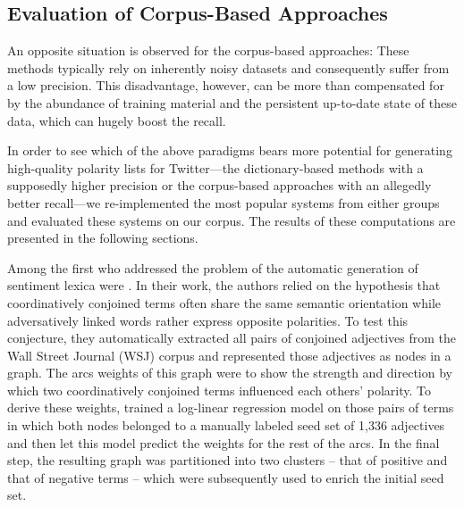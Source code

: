 

\subsection{Evaluation of Corpus-Based Approaches}

An opposite situation is observed for the corpus-based approaches:
These methods typically rely on inherently noisy datasets and
consequently suffer from a low precision.  This disadvantage, however,
can be more than compensated for by the abundance of training material
and the persistent up-to-date state of these data, which can hugely
boost the recall.

In order to see which of the above paradigms bears more potential for
generating high-quality polarity lists for Twitter---the
dictionary-based methods with a supposedly higher precision or the
corpus-based approaches with an allegedly better recall---we
re-implemented the most popular systems from either groups and
evaluated these systems on our corpus.  The results of these
computations are presented in the following sections.

Among the first who addressed the problem of the automatic generation
of sentiment lexica were \citet{Hatzivassi:97}.  In their work, the
authors relied on the hypothesis that coordinatively conjoined terms
often share the same semantic orientation while adversatively linked
words rather express opposite polarities.  To test this conjecture,
they automatically extracted all pairs of conjoined adjectives from
the Wall Street Journal (WSJ) corpus and represented those adjectives
as nodes in a graph.  The arcs weights of this graph were to show the
strength and direction by which two coordinatively conjoined terms
influenced each others' polarity.  To derive these weights,
\citeauthor{Hatzivassi:97} trained a log-linear regression model on
those pairs of terms in which both nodes belonged to a manually
labeled seed set of 1,336 adjectives and then let this model predict
the weights for the rest of the arcs.  In the final step, the
resulting graph was partitioned into two clusters -- that of positive
and that of negative terms -- which were subsequently used to enrich
the initial seed set.

